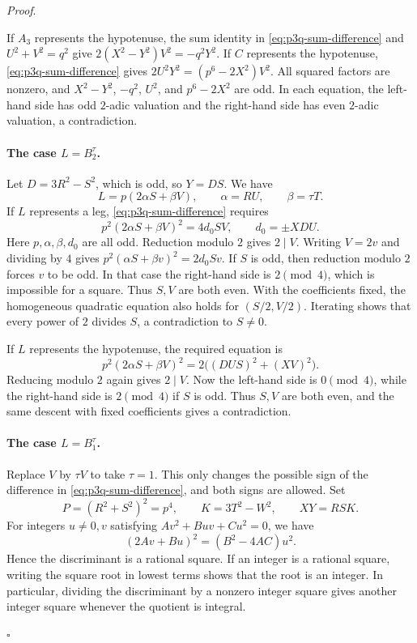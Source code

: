 \documentclass[11pt,a4paper,twoside]{article}
\numberwithin{equation}{section}
\newcommand{\proseheadingstop}{.}
\providecommand{\proofname}{Proof}
\newenvironment{proof}[1][\proofname]{%
  \par\addvspace{.65\baselineskip}\noindent
  \textit{#1}\proseheadingstop\enspace\ignorespaces
}{%
  \unskip\nobreak\hfill\nobreak\(\square\)\par
  \addvspace{.65\baselineskip}
}
\begin{document}
\begin{proof}
If \(A_3\) represents the hypotenuse, the sum identity in \eqref{eq:p3q-sum-difference} and \(U^2+V^2=q^2\) give \(2(X^2-Y^2)V^2=-q^2Y^2\). If \(C\) represents the hypotenuse, \eqref{eq:p3q-sum-difference} gives \(2U^2Y^2=(p^6-2X^2)V^2\). All squared factors are nonzero, and \(X^2-Y^2\), \(-q^2\), \(U^2\), and \(p^6-2X^2\) are odd. In each equation, the left-hand side has odd \(2\)-adic valuation and the right-hand side has even \(2\)-adic valuation, a contradiction.

\paragraph{The case \(L=B_2^\tau\).}
Let \(D=3R^2-S^2\), which is odd, so \(Y=DS\). We have
\[
L=p(2\alpha S+\beta V),\qquad \alpha=RU,\qquad \beta=\tau T.
\]
If \(L\) represents a leg, \eqref{eq:p3q-sum-difference} requires
\[
p^2(2\alpha S+\beta V)^2=4d_0SV,\qquad d_0=\pm XDU.
\]
Here \(p,\alpha,\beta,d_0\) are all odd. Reduction modulo \(2\) gives \(2\mid V\). Writing \(V=2v\) and dividing by \(4\) gives \(p^2(\alpha S+\beta v)^2=2d_0Sv\). If \(S\) is odd, then reduction modulo \(2\) forces \(v\) to be odd. In that case the right-hand side is \(2\pmod4\), which is impossible for a square. Thus \(S,V\) are both even. With the coefficients fixed, the homogeneous quadratic equation also holds for \((S/2,V/2)\). Iterating shows that every power of \(2\) divides \(S\), a contradiction to \(S\ne0\).

If \(L\) represents the hypotenuse, the required equation is
\[
p^2(2\alpha S+\beta V)^2=2\bigl((DUS)^2+(XV)^2\bigr).
\]
Reducing modulo \(2\) again gives \(2\mid V\). Now the left-hand side is \(0\pmod4\), while the right-hand side is \(2\pmod4\) if \(S\) is odd. Thus \(S,V\) are both even, and the same descent with fixed coefficients gives a contradiction.

\paragraph{The case \(L=B_1^\tau\).}
Replace \(V\) by \(\tau V\) to take \(\tau=1\). This only changes the possible sign of the difference in \eqref{eq:p3q-sum-difference}, and both signs are allowed. Set
\[
P=(R^2+S^2)^2=p^4,\qquad K=3T^2-W^2,\qquad XY=RSK.
\]
For integers \(u\ne0,v\) satisfying \(Av^2+Buv+Cu^2=0\), we have
\begin{equation}\label{eq:p3q-discriminant}
(2Av+Bu)^2=(B^2-4AC)u^2.
\end{equation}
Hence the discriminant is a rational square. If an integer is a rational square, writing the square root in lowest terms shows that the root is an integer. In particular, dividing the discriminant by a nonzero integer square gives another integer square whenever the quotient is integral.


\end{proof}
\end{document}
